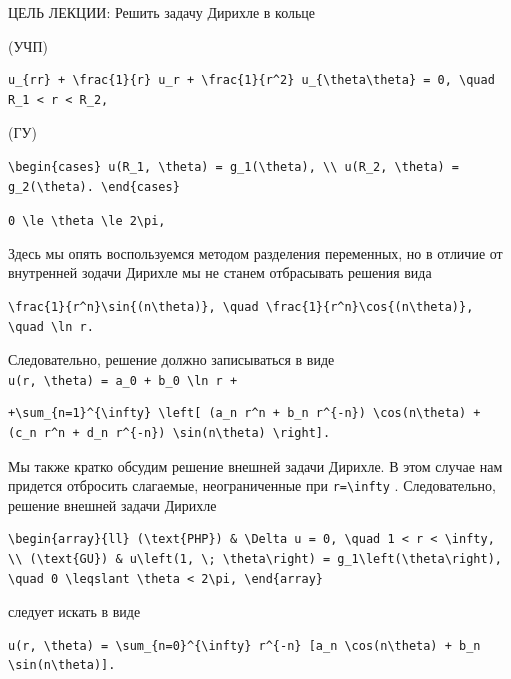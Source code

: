 \documentclass[
  ukrainian,
]{article}
\begin{document}
ЦЕЛЬ ЛЕКЦИИ: Решить задачу Дирихле в кольце

(УЧП)

\begin{verbatim}
u_{rr} + \frac{1}{r} u_r + \frac{1}{r^2} u_{\theta\theta} = 0, \quad R_1 < r < R_2,
\end{verbatim}

(ГУ)

\begin{verbatim}
\begin{cases} u(R_1, \theta) = g_1(\theta), \\ u(R_2, \theta) = g_2(\theta). \end{cases}
\end{verbatim}

\texttt{0\ \textbackslash{}le\ \textbackslash{}theta\ \textbackslash{}le\ 2\textbackslash{}pi,}

Здесь мы опять воспользуемся методом разделения переменных, но в отличие
от внутренней зодачи Дирихле мы не станем отбрасывать решения вида

\begin{verbatim}
\frac{1}{r^n}\sin{(n\theta)}, \quad \frac{1}{r^n}\cos{(n\theta)}, \quad \ln r.
\end{verbatim}

Следовательно, решение должно записываться в виде
\texttt{u(r,\ \textbackslash{}theta)\ =\ a\_0\ +\ b\_0\ \textbackslash{}ln\ r\ +}

\begin{verbatim}
+\sum_{n=1}^{\infty} \left[ (a_n r^n + b_n r^{-n}) \cos(n\theta) + (c_n r^n + d_n r^{-n}) \sin(n\theta) \right].
\end{verbatim}

Мы также кратко обсудим решение внешней задачи Дирихле. В этом случае
нам придется отбросить слагаемые, неограниченные при
\texttt{r=\textbackslash{}infty} . Следовательно, решение внешней задачи
Дирихле

\begin{verbatim}
\begin{array}{ll} (\text{PHP}) & \Delta u = 0, \quad 1 < r < \infty, \\ (\text{GU}) & u\left(1, \; \theta\right) = g_1\left(\theta\right), \quad 0 \leqslant \theta < 2\pi, \end{array}
\end{verbatim}

следует искать в виде

\begin{verbatim}
u(r, \theta) = \sum_{n=0}^{\infty} r^{-n} [a_n \cos(n\theta) + b_n \sin(n\theta)].
\end{verbatim}
\end{document}

